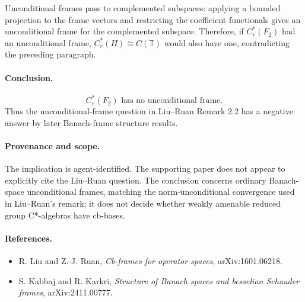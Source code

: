 \documentclass[11pt]{article}
\begin{document}
Unconditional frames pass to complemented subspaces: applying a bounded
projection to the frame vectors and restricting the coefficient functionals
gives an unconditional frame for the complemented subspace.  Therefore, if
\(C_r^*(F_2)\) had an unconditional frame, \(C_r^*(H)\cong C(\mathbb T)\) would
also have one, contradicting the preceding paragraph.

\paragraph{Conclusion.}
\[
  C_r^*(F_2) \text{ has no unconditional frame.}
\]
Thus the unconditional-frame question in Liu--Ruan Remark 2.2 has a negative
answer by later Banach-frame structure results.

\paragraph{Provenance and scope.}
The implication is agent-identified.  The supporting paper does not appear to
explicitly cite the Liu--Ruan question.  The conclusion concerns ordinary
Banach-space unconditional frames, matching the norm-unconditional convergence
used in Liu--Ruan's remark; it does not decide whether weakly amenable reduced
group C*-algebras have cb-bases.

\paragraph{References.}
\begin{itemize}
  \item R. Liu and Z.-J. Ruan, \emph{Cb-frames for operator spaces},
  arXiv:1601.06218.
  \item S. Kabbaj and R. Karkri, \emph{Structure of Banach spaces and besselian
  Schauder frames}, arXiv:2411.00777.
\end{itemize}
\end{document}
